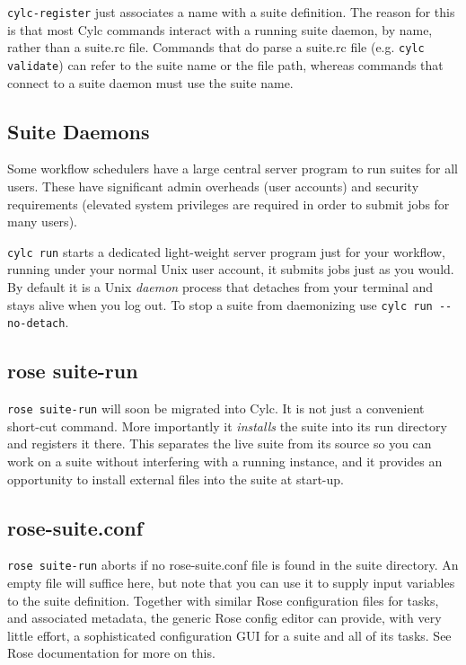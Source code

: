\lstinline{cylc-register} just associates a name with a suite definition.  The
reason for this is that most Cylc commands interact with a running suite
daemon, by name, rather than a suite.rc file.  Commands that do parse a
suite.rc file (e.g.  \lstinline=cylc validate=) can refer to the suite name or
the file path, whereas commands that connect to a suite daemon must use the
suite name.

\subsection{Suite Daemons}

Some workflow schedulers have a large central server program to run suites
for all users.  These have significant admin overheads (user accounts) and
security requirements (elevated system privileges are required in order to
submit jobs for many users).

\lstinline=cylc run= starts a dedicated light-weight server program just for your
workflow, running under your normal Unix user account, it submits jobs just
as you would. By default it is a Unix {\em daemon} process that detaches from
your terminal and stays alive when you log out. To stop a suite from
daemonizing use \lstinline=cylc run --no-detach=. 


\subsection{rose suite-run}

\lstinline{rose suite-run} will soon be migrated into Cylc. It is not
just a convenient short-cut command. More importantly it {\em installs} the
suite into its run directory and registers it there.  This separates the
live suite from its source so you can work on a suite without interfering with
a running instance, and it provides an opportunity to install external
files into the suite at start-up.

\subsection{rose-suite.conf}

\lstinline=rose suite-run= aborts if no rose-suite.conf file is found in the
suite directory.  An empty file will suffice here, but note that you can use it
to supply input variables to the suite definition.  Together with similar
Rose configuration files for tasks, and associated metadata, the generic Rose
config editor can provide, with very little effort, a sophisticated
configuration GUI for a suite and all of its tasks.  See Rose documentation for
more on this.

